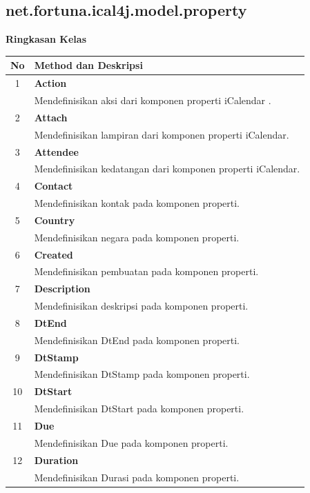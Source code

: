 \subsection{net.fortuna.ical4j.model.property}
\label{subs:net.fortuna.ical4j.model.property}
	\noindent \textbf{Ringkasan Kelas}\cite{ical}
	\begin{table}[H]
		\centering
		\caption{Tabel ringkasan kelas net.fortuna.ical4j.model.property}
		\label{tab:net.fortuna.ical4j.model.property}
	\begin{longtable}{|c|p{12cm}|}
		\hline
		\textbf{No} & \textbf{Method dan Deskripsi} \\ \hline \hline
		1 & \textbf{Action}\\
			&	Mendefinisikan aksi dari komponen properti iCalendar .\\ \hline
		2 & \textbf{Attach}\\
			&	Mendefinisikan lampiran dari komponen properti iCalendar. \\ \hline
		3 & \textbf{Attendee}\\
			&	Mendefinisikan kedatangan dari komponen properti iCalendar.\\ \hline
		4 & \textbf{Contact}\\
			&	Mendefinisikan kontak pada komponen properti.\\ \hline
		5 & \textbf{Country}\\
			&	Mendefinisikan negara pada komponen properti.\\ \hline
		6 & \textbf{Created}\\
			&	Mendefinisikan pembuatan pada komponen properti.\\ \hline
		7 & \textbf{Description}\\
			&	Mendefinisikan deskripsi pada komponen properti.\\ \hline
		8 & \textbf{DtEnd}\\
			&	Mendefinisikan DtEnd pada komponen properti.\\ \hline
		9 & \textbf{DtStamp}\\
			&	Mendefinisikan DtStamp pada komponen properti.\\ \hline
		10 & \textbf{DtStart}\\
			&	Mendefinisikan DtStart pada komponen properti.\\ \hline
		11 & \textbf{Due}\\
			&	Mendefinisikan Due pada komponen properti.\\ \hline
		12 & \textbf{Duration}\\
			&	Mendefinisikan Durasi pada komponen properti.\\ \hline

\end{longtable}
\end{table}

